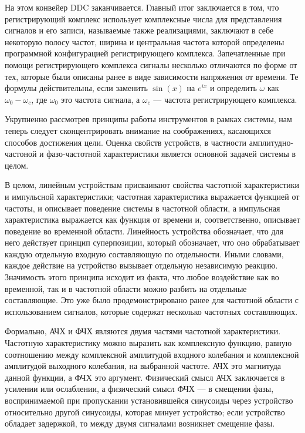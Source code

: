 \documentclass{report}
\begin{document}
На этом конвейер DDC заканчивается. Главный итог заключается в том, что регистрирующий комплекс использует комплексные числа для представления сигналов и его записи, называемые также реализациями, заключают в себе некоторую полосу частот, ширина и центральная частота которой определены программной конфигурацией регистрирующего комплекса. Запечатленные при помощи регистрирующего комплекса сигналы несколько отличаются по форме от тех, которые были описаны ранее в виде зависимости напряжения от времени. Те формулы действительны, если заменить $\sin(x)$ на $e^{ix}$ и определить $\omega$ как $\omega_0 - \omega_c$, где $\omega_0$ это частота сигнала, а $\omega_c$ --- частота регистрирующего комплекса.

Укрупненно рассмотрев принципы работы инструментов в рамках системы, нам теперь следует сконцентрировать внимание на соображениях, касающихся способов достижения цели. Оценка свойств устройств, в частности амплитудно-частоной и фазо-частотной характеристики является основной задачей системы в целом.

В целом, линейным устройствам присваивают свойства частотной характеристики и импульсной характеристики; частотная характеристика выражается функцией от частоты, и описывает поведение системы в частотной области, а импульсная характеристика выражается как функция от времени и, соответственно, описывает поведение во временной области. Линейность устройства обозначает, что для него действует принцип суперпозиции, который обозначает, что оно обрабатывает каждую отдельную входную составляющую по отдельности. Иными словами, каждое действие на устройство вызывает отдельную независимую реакцию. Значимость этого принципа исходит из факта, что любое воздействие как во временной, так и в частотной области можно разбить на отдельные составляющие. Это уже было продемонстрировано ранее для частотной области с использованием сигналов, которые содержат несколько частотных составляющих.

Формально, АЧХ и ФЧХ являются двумя частями частотной характеристики. Частотную характеристику можно выразить как комплексную функцию, равную соотношению между комплексной амплитудой входного колебания и комплексной амплитудой выходного колебания, на выбранной частоте. АЧХ это магнитуда данной функции, а ФЧХ это аргумент. Физический смысл АЧХ заключается в усилении или ослаблении, а физический смысл ФЧХ --- в смещении фазы, воспринимаемой при пропускании установившейся синусоиды через устройство относительно другой синусоиды, которая минует устройство; если устройство обладает задержкой, то между двумя сигналами возникнет смещение фазы.
\end{document}
